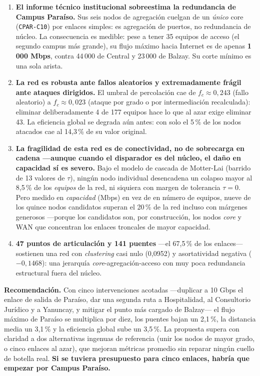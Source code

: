 \documentclass[10pt,a4paper]{extarticle}
\newcommand{\code}[1]{\texttt{\small #1}}
\begin{document}
\begin{enumerate}[leftmargin=*,itemsep=2mm]
\item \textbf{El informe técnico institucional sobreestima la redundancia de Campus
Paraíso.} Sus seis nodos de agregación cuelgan de un \textit{único} core (\code{CPAR-C10})
por enlaces simples: es agregación de puertos, no redundancia de núcleo. La consecuencia
es medible: pese a tener 35 equipos de acceso (el segundo campus más grande), su flujo
máximo hacia Internet es de apenas \textbf{1\,000 Mbps}, contra 44\,000 de Central y
23\,000 de Balzay. Su corte mínimo es una sola arista.

\item \textbf{La red es robusta ante fallos aleatorios y extremadamente frágil ante
ataques dirigidos.} El umbral de percolación cae de $f_c \approx 0{,}243$ (fallo
aleatorio) a $f_c \approx 0{,}023$ (ataque por grado o por intermediación recalculada):
eliminar deliberadamente 4 de 177 equipos hace lo que al azar exige eliminar 43. La
eficiencia global se degrada aún antes: con solo el 5\,\% de los nodos atacados cae al
14,3\,\% de su valor original.

\item \textbf{La fragilidad de esta red es de conectividad, no de sobrecarga en cadena
---aunque cuando el disparador es del núcleo, el daño en capacidad sí es severo.} Bajo el
modelo de cascada de Motter-Lai (barrido de 13 valores de $\tau$), ningún nodo individual
desencadena un colapso mayor al 8,5\,\% de los \textit{equipos} de la red, ni siquiera con
margen de tolerancia $\tau = 0$. Pero medido en \textit{capacidad} (Mbps) en vez de en
número de equipos, nueve de los quince nodos candidatos superan el 20\,\% de la red incluso
con márgenes generosos ---porque los candidatos son, por construcción, los nodos \textit{core}
y WAN que concentran los enlaces troncales de mayor capacidad.

\item \textbf{47 puntos de articulación y 141 puentes} ---el 67,5\,\% de los enlaces---
sostienen una red con \textit{clustering} casi nulo (0,0952) y asortatividad negativa
($-0{,}1468$): una jerarquía \textit{core}-agregación-acceso con muy poca redundancia
estructural fuera del núcleo.
\end{enumerate}

\textbf{Recomendación.} Con cinco intervenciones acotadas ---duplicar a 10 Gbps el enlace
de salida de Paraíso, dar una segunda ruta a Hospitalidad, al Consultorio Jurídico y a
Yanuncay, y mitigar el punto más cargado de Balzay--- el flujo máximo de Paraíso se
multiplica por diez, los puentes bajan un 2,1\,\%, la distancia media un 3,1\,\% y la
eficiencia global sube un 3,5\,\%. La propuesta supera con claridad a dos alternativas
ingenuas de referencia (unir los nodos de mayor grado, o cinco enlaces al azar), que
mejoran métricas promedio sin reparar ningún cuello de botella real. \textbf{Si se
tuviera presupuesto para cinco enlaces, habría que empezar por Campus Paraíso.}
\end{document}
